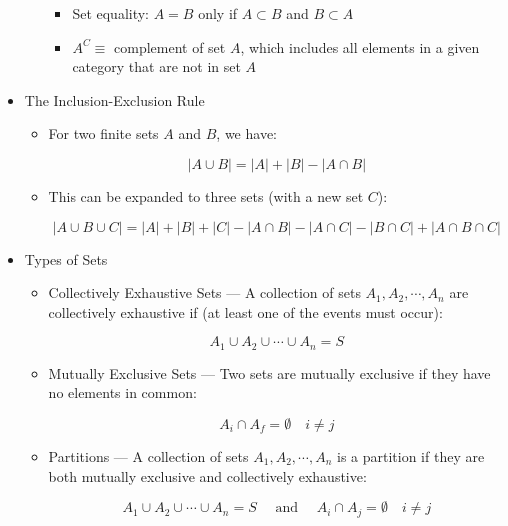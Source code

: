 \begin{itemize}
\begin{itemize}
\begin{itemize}
          \item Set equality: $A=B$ only if $A\subset B$ and $B\subset A$

          \item $A^C\equiv$ complement of set $A$, which includes all elements in a given category that are not in set $A$

        \end{itemize}

    \end{itemize}

  \item The Inclusion-Exclusion Rule

    \begin{itemize}

      \item For two finite sets $A$ and $B$, we have:

        $$|A\cup B|=|A|+|B|-|A\cap B|$$

      \item This can be expanded to three sets (with a new set $C$):

        $$|A\cup B\cup C|=|A|+|B|+|C|-|A\cap B| - |A\cap C| - |B\cap C| + |A\cap B\cap C|$$

    \end{itemize}

  \item Types of Sets

    \begin{itemize}

      \item Collectively Exhaustive Sets — A collection of sets $A_1,A_2,\cdots,A_n$ are collectively exhaustive if (at least one of the events must occur):

        $$A_1\cup A_2 \cup \cdots \cup A_n=S$$

      \item Mutually Exclusive Sets — Two sets are mutually exclusive if they have no elements in common:

        $$A_i\cap A_f = \emptyset\quad i\neq j$$

      \item Partitions — A collection of sets $A_1,A_2,\cdots,A_n$ is a partition if they are both mutually exclusive and collectively exhaustive:

        $$A_1\cup A_2\cup \cdots \cup A_n=S\quad\text{ and }\quad A_i\cap A_j=\emptyset\quad i\neq j$$

    \end{itemize}


\end{itemize}
